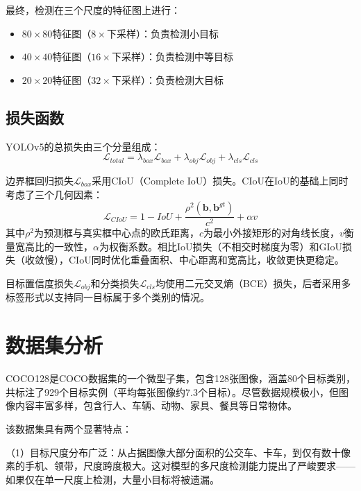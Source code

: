 \documentclass[12pt,a4paper]{article}
\begin{document}
最终，检测在三个尺度的特征图上进行：
\begin{itemize}[leftmargin=*]
    \item $80 \times 80$特征图（$8\times$下采样）：负责检测小目标
    \item $40 \times 40$特征图（$16\times$下采样）：负责检测中等目标
    \item $20 \times 20$特征图（$32\times$下采样）：负责检测大目标
\end{itemize}

\subsection{损失函数}

YOLOv5的总损失由三个分量组成：
\begin{equation}
\mathcal{L}_{total} = \lambda_{box}\mathcal{L}_{box} + \lambda_{obj}\mathcal{L}_{obj} + \lambda_{cls}\mathcal{L}_{cls}
\end{equation}

边界框回归损失$\mathcal{L}_{box}$采用CIoU（Complete IoU）损失。CIoU在IoU的基础上同时考虑了三个几何因素：
\begin{equation}
\mathcal{L}_{CIoU} = 1 - IoU + \frac{\rho^2(\mathbf{b}, \mathbf{b}^{gt})}{c^2} + \alpha v
\end{equation}
其中$\rho^2$为预测框与真实框中心点的欧氏距离，$c$为最小外接矩形的对角线长度，$v$衡量宽高比的一致性，$\alpha$为权衡系数。相比IoU损失（不相交时梯度为零）和GIoU损失（收敛慢），CIoU同时优化重叠面积、中心距离和宽高比，收敛更快更稳定。

目标置信度损失$\mathcal{L}_{obj}$和分类损失$\mathcal{L}_{cls}$均使用二元交叉熵（BCE）损失，后者采用多标签形式以支持同一目标属于多个类别的情况。

\section{数据集分析}

COCO128是COCO数据集的一个微型子集，包含128张图像，涵盖80个目标类别，共标注了929个目标实例（平均每张图像约7.3个目标）。尽管数据规模极小，但图像内容丰富多样，包含行人、车辆、动物、家具、餐具等日常物体。

该数据集具有两个显著特点：

（1）目标尺度分布广泛：从占据图像大部分面积的公交车、卡车，到仅有数十像素的手机、领带，尺度跨度极大。这对模型的多尺度检测能力提出了严峻要求——如果仅在单一尺度上检测，大量小目标将被遗漏。
\end{document}

